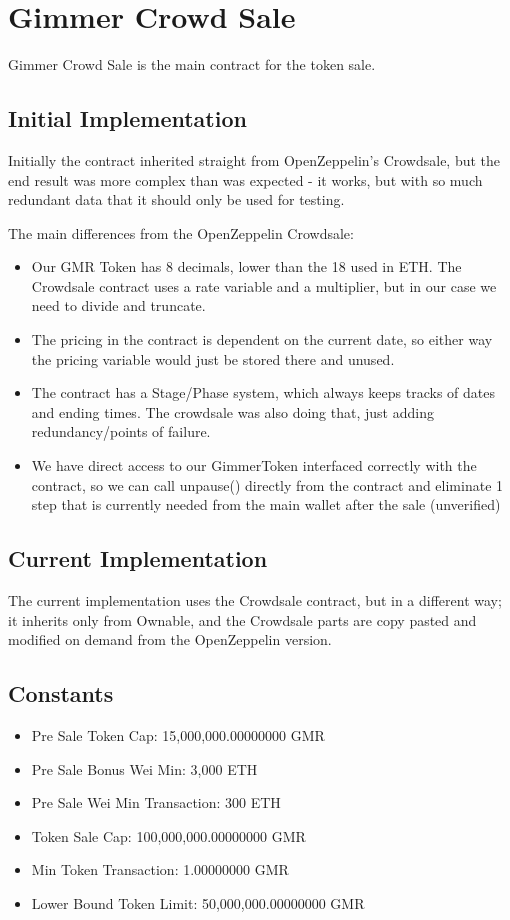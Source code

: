 \documentclass[11pt]{article} %
\begin{document}
\section{Gimmer Crowd Sale}

Gimmer Crowd Sale is the main contract for the token sale.

\subsection{Initial Implementation}
Initially the contract inherited straight from OpenZeppelin's Crowdsale, but the end result was more complex than was expected - it works, but with so much redundant data that it should only be used for testing.

The main differences from the OpenZeppelin Crowdsale:

\begin{itemize}
\item Our GMR Token has 8 decimals, lower than the 18 used in ETH. The Crowdsale contract uses a rate variable and a multiplier, but in our case we need to divide and truncate.
\item The pricing in the contract is dependent on the current date, so either way the pricing variable would just be stored there and unused.
\item The contract has a Stage/Phase system, which always keeps tracks of dates and ending times. The crowdsale was also doing that, just adding redundancy/points of failure.
\item We have direct access to our GimmerToken interfaced correctly with the contract, so we can call unpause() directly from the contract and eliminate 1 step that is currently needed from the main wallet after the sale (unverified)
\end{itemize}

\subsection{Current Implementation}
The current implementation uses the Crowdsale contract, but in a different way; it inherits only from Ownable, and the Crowdsale parts are copy pasted and modified on demand from the OpenZeppelin version.

\subsection{Constants}

\begin{itemize}
\item Pre Sale Token Cap: 15,000,000.00000000 GMR
\item Pre Sale Bonus Wei Min: 3,000 ETH
\item Pre Sale Wei Min Transaction: 300 ETH
\item Token Sale Cap: 100,000,000.00000000 GMR
\item Min Token Transaction: 1.00000000 GMR
\item Lower Bound Token Limit: 50,000,000.00000000 GMR
\end{itemize}
\end{document}
